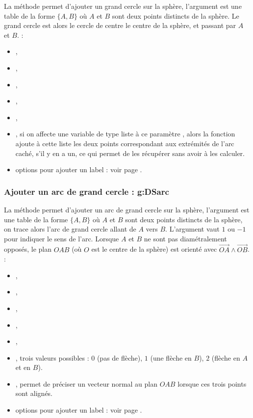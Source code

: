La méthode  permet d'ajouter un grand cercle sur la sphère, l'argument  est une table de la forme $\{A,B\}$ où $A$ et $B$ sont deux points distincts de la sphère. Le grand cercle est alors le cercle de centre le centre de la sphère, et passant par $A$ et $B$. \writeoptions :
    \begin{itemize}
        \item {}, 
        \item {},
        \item {},
        \item {},
        \item {},
        \item {}, si on affecte une variable de type liste à ce paramètre , alors la fonction ajoute à cette liste les deux points correspondant aux extrémités de l'arc caché, s'il y en a un, ce qui permet de les récupérer sans avoir à les calculer.
        \item options pour ajouter un label : voir page \pageref{addlabel}.
    \end{itemize}
    
\subsubsection{Ajouter un arc de grand cercle : g:DSarc}

La méthode  permet d'ajouter un arc de grand cercle sur la sphère, l'argument  est une table de la forme $\{A,B\}$ où $A$ et $B$ sont deux points distincts de la sphère, on trace alors l'arc de grand cercle allant de $A$ vers $B$. L'argument  vaut $1$ ou $-1$ pour indiquer le sens de l'arc. Lorsque $A$ et $B$ ne sont pas diamétralement opposés, le plan $OAB$ (où $O$ est le centre de la sphère) est orienté avec $\vec{OA}\wedge\vec{OB}$. \writeoptions :
    \begin{itemize}
        \item {}, 
        \item {},
        \item {},
        \item {},
        \item {},
        \item {}, trois valeurs possibles : $0$ (pas de flèche), $1$ (une flèche en $B$), $2$ (flèche en $A$ et en $B$).
        \item {}, permet de préciser un vecteur normal au plan $OAB$ lorsque ces trois points sont alignés.
        \item options pour ajouter un label : voir page \pageref{addlabel}.
    \end{itemize}

